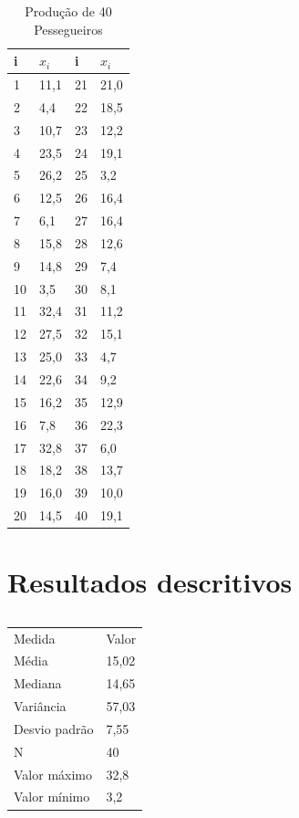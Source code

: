\documentclass[a4paper,12pt]{article}
\begin{document}
\begin{table}[H]
  \centering
\begin{tabular}{ll|ll}
\toprule
i&$x_i$&i&$x_i$\\
\midrule
1 & 11,1 & 21 & 21,0 \\
2 & 4,4 & 22 & 18,5 \\
3 & 10,7 & 23 & 12,2 \\
4 & 23,5 & 24 & 19,1 \\
5 & 26,2 & 25 & 3,2 \\
6 & 12,5 & 26 & 16,4 \\
7 & 6,1 & 27 & 16,4 \\
8 & 15,8 & 28 & 12,6 \\
9 & 14,8 & 29 & 7,4 \\
10 & 3,5 & 30 & 8,1 \\
11 & 32,4 & 31 & 11,2 \\
12 & 27,5 & 32 & 15,1 \\
13 & 25,0 & 33 & 4,7 \\
14 & 22,6 & 34 & 9,2 \\
15 & 16,2 & 35 & 12,9 \\
16 & 7,8 & 36 & 22,3 \\
17 & 32,8 & 37 & 6,0 \\
18 & 18,2 & 38 & 13,7 \\
19 & 16,0 & 39 & 10,0 \\
20 & 14,5 & 40 & 19,1\\
\bottomrule
\end{tabular}
  \caption{Produção de 40 Pessegueiros}
\label{tab:pessegueiro}
\end{table}

\section{Resultados descritivos}

\begin{table}[H]
  \centering
\begin{tabular}{ll}
  \toprule
Medida & Valor \\
Média & 15,02 \\
Mediana & 14,65 \\
Variância & 57,03 \\
Desvio padrão & 7,55 \\
N & 40 \\
Valor máximo & 32,8 \\
Valor mínimo & 3,2\\
\bottomrule
\end{tabular}
\caption{}
\label{tab:pesse_desc}
\end{table}
\end{document}
